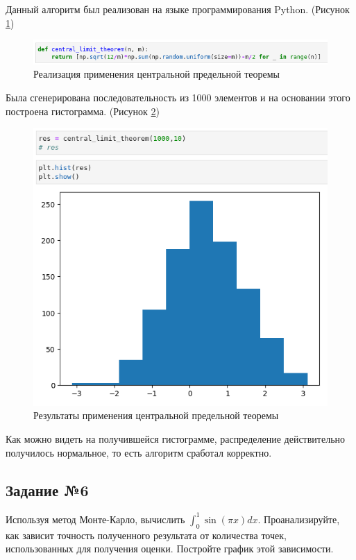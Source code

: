 \documentclass[14pt,fleqn]{extarticle}
\begin{document}
	\newpage
	
	Данный алгоритм был реализован на языке программирования Python. (Рисунок \ref{fig:central_limit_theorem_code})
	\begin{figure}[h]
		\centering \includegraphics[scale=0.65]{central_limit_theorem_code}
		\caption{Реализация применения центральной предельной теоремы}
		\label{fig:central_limit_theorem_code}
	\end{figure}
	
	Была сгенерирована последовательность из 1000 элементов и на основании этого построена гистограмма. (Рисунок \ref{fig:central_limit_theorem_result})
	
	\begin{figure}[h]
		\centering \includegraphics[scale=0.6]{central_limit_theorem_result}
		\caption{Результаты применения центральной предельной теоремы}
		\label{fig:central_limit_theorem_result}
	\end{figure}
	
	Как можно видеть на получившейся гистограмме, распределение действительно получилось нормальное, то есть алгоритм сработал корректно.
	
	\newpage
	
	\subsection*{Задание №6}
	Используя метод Монте-Карло, вычислить $\int_{0}^{1} \sin(\pi x) dx$. Проанализируйте, как зависит точность полученного результата от количества точек, использованных для получения оценки. Постройте график этой зависимости.
	\newline
	
\end{document}
